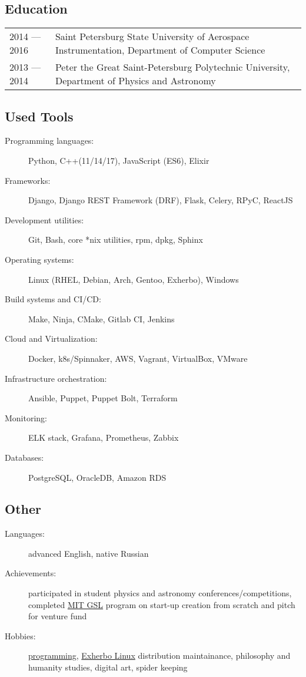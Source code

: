 \documentclass[10pt]{report}
\begin{document}
\subsection*{Education}
\begin{table}[H]
    \begin{tabular}{@{}p{}p{}}
        2014 --- 2016 & Saint Petersburg State University of Aerospace Instrumentation, Department of Computer Science \\
        2013 --- 2014 & Peter the Great Saint-Petersburg Polytechnic University, Department of Physics and Astronomy
    \end{tabular}
\end{table}

\subsection*{Used Tools}
\begin{description}
    \item[Programming languages:]
    Python, C++(11/14/17), JavaScript (ES6), Elixir
    \item[Frameworks:]
    Django, Django REST Framework (DRF), Flask, Celery, RPyC, ReactJS
    \item[Development utilities:]
    Git, Bash, core *nix utilities, rpm, dpkg, Sphinx
    \item[Operating systems:]
    Linux (RHEL, Debian, Arch, Gentoo, Exherbo), Windows
    \item[Build systems and CI/CD:]
    Make, Ninja, CMake, Gitlab CI, Jenkins
    \item[Cloud and Virtualization:]
    Docker, k8s/Spinnaker, AWS, Vagrant, VirtualBox, VMware
    \item[Infrastructure orchestration:]
    Ansible, Puppet, Puppet Bolt, Terraform
    \item[Monitoring:]
    ELK stack, Grafana, Prometheus, Zabbix
    \item[Databases:]
    PostgreSQL, OracleDB, Amazon RDS
\end{description}

\subsection*{Other}
\begin{description}
    \item[Languages:]
    advanced English, native Russian
    \item[Achievements:]
    participated in student physics and astronomy conferences/competitions,
    completed \href{https://gsl.mit.edu/}{MIT GSL} program on start-up creation from scratch and pitch for venture fund
    \item[Hobbies:]
    \href{https://github.com/unsip}{programming}, \href{https://exherbo.org/}{Exherbo Linux} distribution maintainance,
        philosophy and humanity studies, digital art, spider keeping
\end{description}
\end{document}
